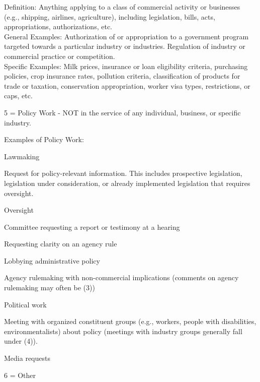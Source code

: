 \hfill\begin{minipage}{\dimexpr\textwidth-2cm}
Definition: Anything applying to a class of commercial activity or businesses (e.g., shipping, airlines, agriculture), including legislation, bills, acts, appropriations, authorizations, etc. \\
General Examples: Authorization of or appropriation to a government program targeted towards a particular industry or industries. Regulation of industry or commercial practice or competition.\\
Specific Examples: Milk prices, insurance or loan eligibility criteria, purchasing policies, crop insurance rates, pollution criteria, classification of products for trade or taxation, conservation appropriation, worker visa types, restrictions, or caps, etc.\\
\end{minipage}
 
5 = Policy Work - NOT in the service of any individual, business, or specific industry.\\

\hfill\begin{minipage}{\dimexpr\textwidth-2cm}
Examples of Policy Work: 
 \begin{tight_itemize} 
 \item Lawmaking 
\item Request for policy-relevant information. This includes prospective legislation, legislation under consideration, or already implemented legislation that requires oversight.  
\item Oversight
\item Committee requesting a report or testimony at a hearing
\item Requesting clarity on an agency rule
\item Lobbying administrative policy
\item Agency rulemaking with non-commercial implications (comments on agency rulemaking may often be (3)) 
\item Political work
\item Meeting with organized constituent groups (e.g., workers, people with disabilities, environmentalists) about policy (meetings with industry groups generally fall under (4)).
\item Media requests
 \end{tight_itemize} 
\end{minipage}
\bigskip


6 = Other \\

